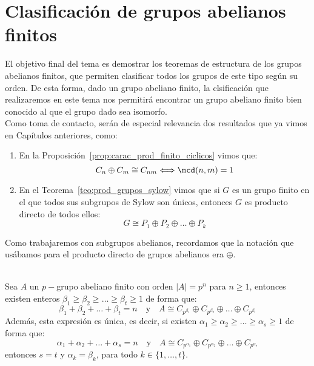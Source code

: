 \chapter{Clasificación de grupos abelianos finitos}
\noindent
El objetivo final del tema es demostrar los teoremas de estructura de los grupos abelianos finitos, que permiten clasificar todos los grupos de este tipo según su orden. De esta forma, dado un grupo abeliano finito, la clsificación que realizaremos en este tema nos permitirá encontrar un grupo abeliano finito bien conocido al que el grupo dado sea isomorfo.\\

\noindent
Como toma de contacto, serán de especial relevancia dos resultados que ya vimos en Capítulos anteriores, como:

\begin{enumerate}
    \item En la Proposición~\ref{prop:carac_prod_finito_ciclicos} vimos que:
        \begin{equation*}
            C_n\oplus C_m \cong C_{nm} \Longleftrightarrow \mcd(n,m) = 1
        \end{equation*}
    \item En el Teorema~\ref{teo:prod_grupos_sylow} vimos que si $G$ es un grupo finito en el que todos sus subgrupos de Sylow son únicos, entonces $G$ es producto directo de todos ellos:
        \begin{equation*}
            G \cong P_1\oplus P_2 \oplus \ldots \oplus P_k
        \end{equation*}
\end{enumerate}
Como trabajaremos con subgrupos abelianos, recordamos que la notación que usábamos para el producto directo de grupos abelianos era $\oplus$.

\begin{teo}\label{teo:1_tema6}\ \\
    Sea $A$ un $p-$grupo abeliano finito con orden $|A| = p^n$ para $n\geq 1$, entonces existen enteros $\beta_1\geq \beta_2 \geq \ldots \geq \beta_t \geq 1$ de forma que:
    \begin{equation*}
        \beta_1 + \beta_2 + \ldots + \beta_t = n \quad \text{y} \quad A\cong C_{p^{\beta_1}} \oplus C_{p^{\beta_2}} \oplus \ldots \oplus C_{p^{\beta_t}}
    \end{equation*}
    Además, esta expresión es única, es decir, si existen $\alpha_1\geq \alpha_2\geq \ldots \geq \alpha_s \geq 1$ de forma que:
    \begin{equation*}
        \alpha_1 + \alpha_2 + \ldots + \alpha_s = n \quad \text{y} \quad A\cong C_{p^{\alpha_1}} \oplus C_{p^{\alpha_2}} \oplus \ldots \oplus C_{p^{\alpha_s}}
    \end{equation*}
    entonces $s = t$ y $\alpha_k = \beta_k$, para todo $k \in \{1,\ldots,t\}$.
\end{teo}

